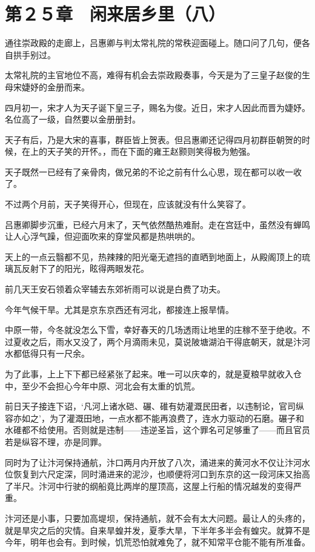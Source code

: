 \section{第２５章　闲来居乡里（八）}

通往崇政殿的走廊上，吕惠卿与判太常礼院的常秩迎面碰上。随口问了几句，便各自拱手别过。

太常礼院的主官地位不高，难得有机会去崇政殿奏事，今天是为了三皇子赵俊的生母宋婕妤的金册而来。

四月初一，宋才人为天子诞下皇三子，赐名为俊。近日，宋才人因此而晋为婕妤。名位高了一级，自然要以金册册封。

天子有后，乃是大宋的喜事，群臣皆上贺表。但吕惠卿还记得四月初群臣朝贺的时候，在上的天子笑的开怀。，而在下面的雍王赵颢则笑得极为勉强。

天子既然一已经有了亲骨肉，做兄弟的不论之前有什么心思，现在都可以收一收了。

不过两个月前，天子笑得开心，但现在，应该就没有什么笑容了。

吕惠卿脚步沉重，已经六月末了，天气依然酷热难耐。走在宫廷中，虽然没有蝉鸣让人心浮气躁，但迎面吹来的穿堂风都是热哄哄的。

天上的一点云翳都不见，热辣辣的阳光毫无遮挡的直晒到地面上，从殿阁顶上的琉璃瓦反射下了的阳光，眩得两眼发花。

前几天王安石领着众宰辅去东郊祈雨可以说是白费了功夫。

今年气候干旱。尤其是京东京西还有河北，都接连上报旱情。

中原一带，今冬就没怎么下雪，幸好春天的几场透雨让地里的庄稼不至于绝收。不过夏收之后，雨水又没了，两个月滴雨未见，莫说陂塘湖泊干得底朝天，就是汴河水都低得只有一尺余。

为了此事，上上下下都已经紧张了起来。唯一可以庆幸的，就是夏粮早就收入仓中，至少不会担心今年中原、河北会有太重的饥荒。

前日天子接连下诏，‘凡河上诸水硙、碾、碓有妨灌溉民田者，以违制论，官司纵容亦如之’，为了灌溉田地，一点水都不能再浪费了，连水力驱动的石磨。碾子和水碓都不给使用。否则就是违制——违逆圣旨，这个罪名可足够重了——而且官员若是纵容不理，亦是同罪。

同时为了让汴河保持通航，汴口两月内开放了八次，涌进来的黄河水不仅让汴河水位恢复到六尺定深，同时涌进来的泥沙，也顺便将河口到东京的这一段河床又抬高了半尺。汴河中行驶的纲船竟比两岸的屋顶高，这屋上行船的情况越发的变得严重。

汴河还是小事，只要加高堤坝，保持通航，就不会有太大问题。最让人的头疼的，就是旱灾之后的灾情。自来旱蝗并发，夏季大旱，下半年多半会有蝗灾。就算不是今年，明年也会有。到时候，饥荒恐怕就难免了，就不知常平仓能不能有所准备。

